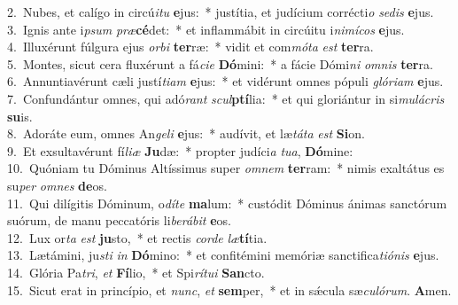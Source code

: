 {2.~}Nubes, et calígo in circú\textit{i}\textit{tu} \textbf{e}jus:~* justítia, et judícium corrécti\textit{o} \textit{se}\textit{dis} \textbf{e}jus.\\
{3.~}Ignis ante i\textit{psum} \textit{præ}\textbf{cé}det:~* et inflammábit in circúitu i\textit{ni}\textit{mí}\textit{cos} \textbf{e}jus.\\
{4.~}Illuxérunt fúlgura ejus \textit{or}\textit{bi} \textbf{ter}ræ:~* vidit et com\textit{mó}\textit{ta} \textit{est} \textbf{ter}ra.\\
{5.~}Montes, sicut cera fluxérunt a fá\textit{ci}\textit{e} \textbf{Dó}mini:~* a fácie Dómi\textit{ni} \textit{om}\textit{nis} \textbf{ter}ra.\\
{6.~}Annuntiavérunt cæli justí\textit{ti}\textit{am} \textbf{e}jus:~* et vidérunt omnes pópuli \textit{gló}\textit{ri}\textit{am} \textbf{e}jus.\\
{7.~}Confundántur omnes, qui adó\textit{rant} \textit{scul}\textbf{ptí}lia:~* et qui gloriántur in si\textit{mu}\textit{lá}\textit{cris} \textbf{su}is.\\
{8.~}Adoráte eum, omnes An\textit{ge}\textit{li} \textbf{e}jus:~* audívit, et læ\textit{tá}\textit{ta} \textit{est} \textbf{Si}on.\\
{9.~}Et exsultavérunt fí\textit{li}\textit{æ} \textbf{Ju}dæ:~* propter judíci\textit{a} \textit{tu}\textit{a}, \textbf{Dó}mine:\\
{10.~}Quóniam tu Dóminus Altíssimus super \textit{om}\textit{nem} \textbf{ter}ram:~* nimis exaltátus es su\textit{per} \textit{om}\textit{nes} \textbf{de}os.\\
{11.~}Qui dilígitis Dóminum, o\textit{dí}\textit{te} \textbf{ma}lum:~* custódit Dóminus ánimas sanctórum suórum, de manu peccatóris li\textit{be}\textit{rá}\textit{bit} \textbf{e}os.\\
{12.~}Lux or\textit{ta} \textit{est} \textbf{ju}sto,~* et rectis \textit{cor}\textit{de} \textit{læ}\textbf{tí}tia.\\
{13.~}Lætámini, ju\textit{sti} \textit{in} \textbf{Dó}mino:~* et confitémini memóriæ sanctifica\textit{ti}\textit{ó}\textit{nis} \textbf{e}jus.\\
{14.~}Glória Pa\textit{tri}, \textit{et} \textbf{Fí}lio,~* et Spi\textit{rí}\textit{tu}\textit{i} \textbf{San}cto.\\
{15.~}Sicut erat in princípio, et \textit{nunc}, \textit{et} \textbf{sem}per,~* et in sǽcula sæ\textit{cu}\textit{ló}\textit{rum}. \textbf{A}men.\\
